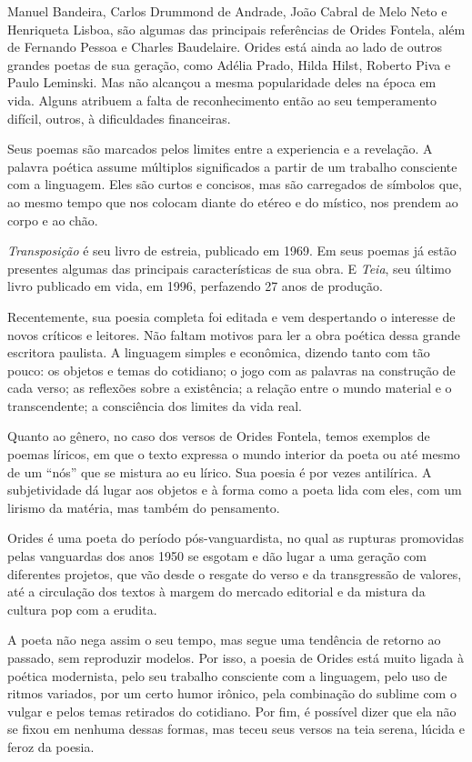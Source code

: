 \documentclass[12pt]{extarticle}
\begin{document}
Manuel Bandeira, Carlos Drummond de Andrade, João Cabral de Melo Neto e
Henriqueta Lisboa, são algumas das principais referências de Orides Fontela,
além de Fernando Pessoa e Charles Baudelaire. Orides está ainda ao lado de
outros grandes poetas de sua geração, como Adélia Prado, Hilda Hilst, Roberto
Piva e Paulo Leminski. Mas não alcançou a mesma popularidade deles na época em
vida. Alguns atribuem a falta de reconhecimento então ao seu temperamento
difícil, outros, à dificuldades financeiras.

Seus poemas são marcados pelos limites entre a experiencia e a revelação. A
palavra poética assume múltiplos significados a partir de um trabalho
consciente com a linguagem. Eles são curtos e concisos, mas são carregados de
símbolos que, ao mesmo tempo que nos colocam diante do etéreo e do místico, nos
prendem ao corpo e ao chão.

\textit{Transposição} é seu livro de estreia, publicado em 1969. Em seus
poemas já estão presentes algumas das principais características de sua obra.
E \textit{Teia}, seu último livro publicado em vida, em 1996, perfazendo 27
anos de produção.

Recentemente, sua poesia completa foi editada e vem despertando o interesse de
novos críticos e leitores. Não faltam motivos para ler a obra poética dessa grande escritora paulista.
A linguagem simples e econômica, dizendo tanto com tão pouco:
os objetos e temas do cotidiano;
o jogo com as palavras na construção de cada verso;
as reflexões sobre a existência;
a relação entre o mundo material e o transcendente;
a consciência dos limites da vida real.


Quanto ao gênero, no caso dos versos de Orides Fontela, temos exemplos de
poemas líricos, em que o texto expressa o mundo interior da poeta ou até mesmo
de um ``nós'' que se mistura ao eu lírico. Sua poesia é por vezes antilírica.
A subjetividade dá lugar aos objetos e à forma como a poeta lida com eles, com
um lirismo da matéria, mas também do pensamento.

Orides é uma poeta do período pós-vanguardista, no qual as rupturas promovidas
pelas vanguardas dos anos 1950 se esgotam e dão lugar a uma geração com
diferentes projetos, que vão desde o resgate do verso e da transgressão de
valores, até a circulação dos textos à margem do mercado editorial e da mistura
da cultura pop com a erudita.

A poeta não nega assim o seu tempo, mas segue uma tendência de retorno ao
passado, sem reproduzir modelos. Por isso, a poesia de Orides está muito ligada
à poética modernista, pelo seu trabalho consciente com a linguagem, pelo uso de
ritmos variados, por um certo humor irônico, pela combinação do sublime com o
vulgar e pelos temas retirados do cotidiano. Por fim, é possível dizer que ela
não se fixou em nenhuma dessas formas, mas teceu seus versos na teia serena,
lúcida e feroz da poesia.
\end{document}

